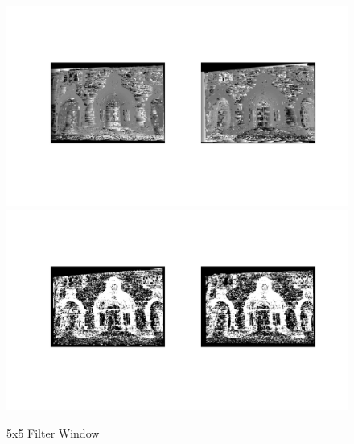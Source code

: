 \documentclass[12pt]{article}
\begin{document}
\begin{figure}[H]
	\centering
	\includegraphics[width=1.1\textwidth]{dc5_1.jpg}
	\includegraphics[width=1.1\textwidth]{dc5_2.jpg}
	\caption{5x5 Filter Window}
	\label{fig1}
\end{figure}
\vspace{5mm}
\end{document}
